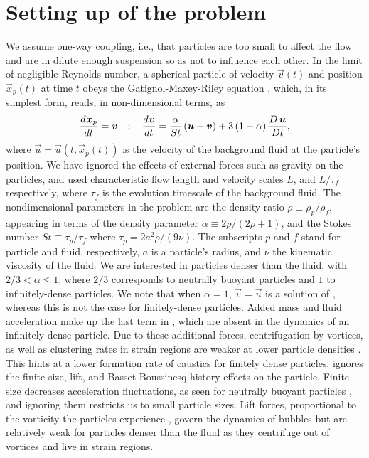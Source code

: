 \documentclass[../Rajarshi-thesis-draft.tex]{subfiles}
\begin{document}
\section{Setting up of the problem}\label{int-sec: system}
We assume one-way coupling, i.e., that particles are too small to affect the flow and are in dilute enough suspension so as not to influence each other. In the limit of negligible Reynolds number, a spherical particle of velocity $\vec{v}(t)$ and position $\vec{x}_p(t)$ at time $t$ obeys the Gatignol-Maxey-Riley equation \cite{maxey1983,gatignol1983}, which, in its simplest form, reads, in non-dimensional terms, as
    \begin{align}
    \label{int-NDeom}
    \begin{split}
      \frac{d^{} \boldsymbol{x}_p}{d t^{}} = \boldsymbol{v} \quad;\quad\frac{d^{} \boldsymbol{v}}{d t^{}} = \frac{\alpha}{St} \left( \boldsymbol{u} - \boldsymbol{v}\right) +3\left( 1 - \alpha \right) \frac{D\, \boldsymbol{u}}{Dt},
    \end{split}
    \end{align}
  where $\vec{u} = \vec{u}(t,\vec{x}_p(t))$ is the velocity of the background fluid at the particle's position. We have ignored the effects of external forces such as gravity on the particles, and used characteristic flow length and velocity scales $L$, and $L/\tau_f$ respectively, where $\tau_f$ is the evolution timescale of the background fluid. The nondimensional parameters in the problem are the density ratio $\rho \equiv \rho_p/\rho_f$, appearing in terms of the density parameter $\alpha \equiv 2\rho/\left( 2\rho + 1 \right)$, and the Stokes number $St \equiv \tau_p/\tau_f$ where
  $\tau_p = 2 a^2 \rho/(9\nu)$. The subscripts $p$ and $f$ stand for particle and fluid, respectively, $a$ is a particle's radius, and $\nu$ the kinematic viscosity of the fluid. We are interested in particles denser than the fluid, with $2/3 < \alpha \le 1$, where $2/3$ corresponds to neutrally buoyant particles and $1$ to infinitely-dense particles. We note that when $\alpha = 1$, $\vec{v} = \vec{u}$ is a solution of , whereas this is not the case for finitely-dense particles. Added mass and fluid acceleration make up the last term in , which are absent in the dynamics of an infinitely-dense particle. Due to these additional forces, centrifugation by vortices, as well as clustering rates in strain regions
  are weaker at lower particle densities   \cite{balkovsky2001,calzavarini2008a,volk2008,qureshi2008,calzavarini2008a, fiabane2012,karchniwy2019, petersen2019, motoori2023}. This hints at a lower formation rate of caustics for finitely dense particles.  ignores the finite size, lift, and Basset-Boussinesq history effects on the particle. Finite size decreases acceleration fluctuations, as seen for neutrally buoyant particles \cite{calzavarini2009}, and ignoring them restricts us to small particle sizes. Lift forces, proportional to the vorticity the particles experience \cite{mathai2020}, govern the dynamics of bubbles  \cite{mazzitelli2003} but are relatively weak for particles denser than the fluid as they centrifuge out of vortices and live in strain regions.
\end{document}
